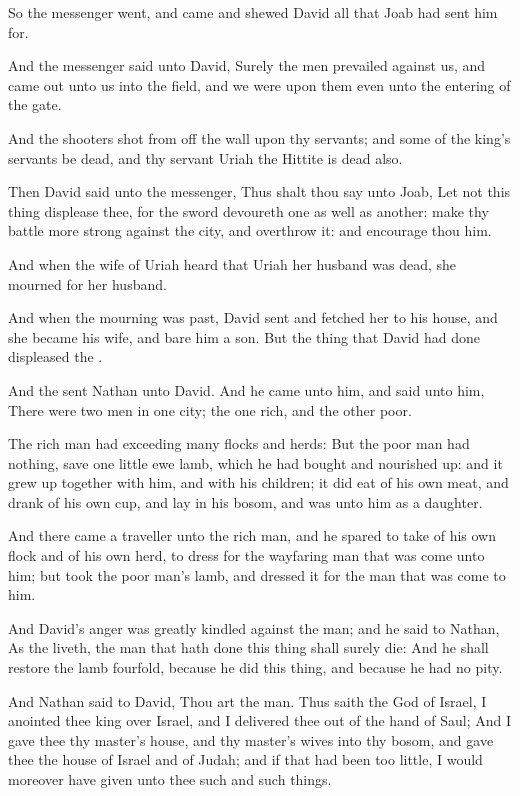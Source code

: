 \Verse So the messenger went, and came and shewed David all that Joab had sent him for.

\Verse And the messenger said unto David, Surely the men prevailed against us, and came out unto us into the field, and we were upon them even unto the entering of the gate.

\Verse And the shooters shot from off the wall upon thy servants; and some of the king's servants be dead, and thy servant Uriah the Hittite is dead also.

\Verse Then David said unto the messenger, Thus shalt thou say unto Joab, Let not this thing displease thee, for the sword devoureth one as well as another: make thy battle more strong against the city, and overthrow it: and encourage thou him.

\Verse And when the wife of Uriah heard that Uriah her husband was dead, she mourned for her husband.

\Verse And when the mourning was past, David sent and fetched her to his house, and she became his wife, and bare him a son. But the thing that David had done displeased the \LORD.


\Chapter
\Verse And the \LORD sent Nathan unto David. And he came unto him, and said unto him, There were two men in one city; the one rich, and the other poor.

\Verse The rich man had exceeding many flocks and herds: \Verse But the poor man had nothing, save one little ewe lamb, which he had bought and nourished up: and it grew up together with him, and with his children; it did eat of his own meat, and drank of his own cup, and lay in his bosom, and was unto him as a daughter.

\Verse And there came a traveller unto the rich man, and he spared to take of his own flock and of his own herd, to dress for the wayfaring man that was come unto him; but took the poor man's lamb, and dressed it for the man that was come to him.

\Verse And David's anger was greatly kindled against the man; and he said to Nathan, As the \LORD liveth, the man that hath done this thing shall surely die: \Verse And he shall restore the lamb fourfold, because he did this thing, and because he had no pity.

\Verse And Nathan said to David, Thou art the man. Thus saith the \LORD God of Israel, I anointed thee king over Israel, and I delivered thee out of the hand of Saul; \Verse And I gave thee thy master's house, and thy master's wives into thy bosom, and gave thee the house of Israel and of Judah; and if that had been too little, I would moreover have given unto thee such and such things.

